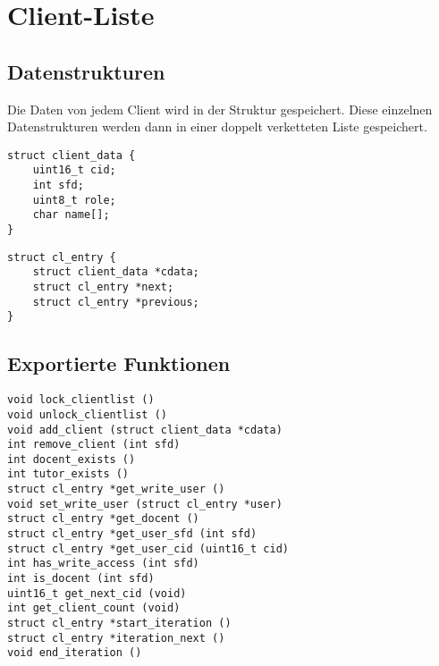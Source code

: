 \section{Client-Liste}

\subsection{Datenstrukturen}
Die Daten von jedem Client wird in der Struktur  gespeichert. 
Diese einzelnen Datenstrukturen werden dann in einer doppelt verketteten Liste gespeichert.
\begin{lstlisting}
struct client_data {
	uint16_t cid;
	int sfd;
	uint8_t role;
	char name[];
}
\end{lstlisting}
\begin{lstlisting}
struct cl_entry {
	struct client_data *cdata;
	struct cl_entry *next;
	struct cl_entry *previous;
}
\end{lstlisting}

\subsection{Exportierte Funktionen}
\begin{lstlisting}
void lock_clientlist ()
void unlock_clientlist ()
void add_client (struct client_data *cdata)
int remove_client (int sfd)
int docent_exists ()
int tutor_exists ()
struct cl_entry *get_write_user ()
void set_write_user (struct cl_entry *user)
struct cl_entry *get_docent ()
struct cl_entry *get_user_sfd (int sfd)
struct cl_entry *get_user_cid (uint16_t cid)
int has_write_access (int sfd)
int is_docent (int sfd)
uint16_t get_next_cid (void)
int get_client_count (void)
struct cl_entry *start_iteration ()
struct cl_entry *iteration_next ()
void end_iteration ()
\end{lstlisting}